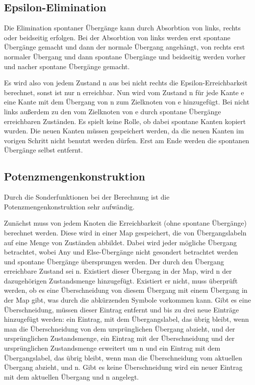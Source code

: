 \subsection{Epsilon-Elimination}
Die Elimination spontaner Übergänge kann durch Absorbtion von links, rechts oder beidseitig erfolgen. Bei der Absorbtion von links werden erst spontane Übergänge gemacht und dann der normale Übergang angehängt, von rechts erst normaler Übergang und dann spontane Übergänge und beidseitig werden vorher und nacher spontane Übergänge gemacht.

Es wird also von jedem Zustand n aus bei nicht rechts die Epsilon-Erreichbarkeit berechnet, sonst ist nur n erreichbar. Nun wird vom Zustand n für jede Kante e eine Kante mit dem Übergang von n zum Zielknoten von e hinzugefügt. Bei nicht links außerdem zu den vom Zielknoten von e durch spontane Übergänge erreichbaren Zuständen. Es spielt keine Rolle, ob dabei spontane Kanten kopiert wurden. Die neuen Kanten müssen gespeichert werden, da die neuen Kanten im vorigen Schritt nicht benutzt werden dürfen. Erst am Ende werden die spontanen Übergänge selbst entfernt.
\subsection{Potenzmengenkonstruktion}
Durch die Sonderfunktionen bei der Berechnung ist die Potenzmengenkonstruktion sehr aufwändig.

Zunächst muss von jedem Knoten die Erreichbarkeit (ohne spontane Übergänge) berechnet werden. Diese wird in einer Map gespeichert, die von Übergangslabeln auf eine Menge von Zuständen abbildet. Dabei wird jeder mögliche Übergang betrachtet, wobei Any und Else-Übergänge nicht gesondert betrachtet werden und spontane Übergänge übersprungen werden. Der durch den Übergang erreichbare Zustand sei n. Existiert dieser Übergang in der Map, wird n der dazugehörigen Zustandsmenge hinzugefügt. Existiert er nicht, muss überprüft werden, ob es eine Überschneidung von diesem Übergang mit einem Übergang in der Map gibt, was durch die abkürzenden Symbole vorkommen kann. Gibt es eine Überschneidung, müssen dieser Eintrag entfernt und bis zu drei neue Einträge hinzugefügt werden: ein Eintrag, mit dem Übergangslabel, das übrig bleibt, wenn man die Überschneidung von dem ursprünglichen Übergang abzieht, und der ursprünglichen Zustandsmenge, ein Eintrag mit der Überschneidung und der ursprünglichen Zustandsmenge erweitert um n und ein Eintrag mit dem Übergangslabel, das übrig bleibt, wenn man die Überschneidung vom aktuellen Übergang abzieht, und n. Gibt es keine Überschneidung wird ein neuer Eintrag mit dem aktuellen Übergang und n angelegt.

